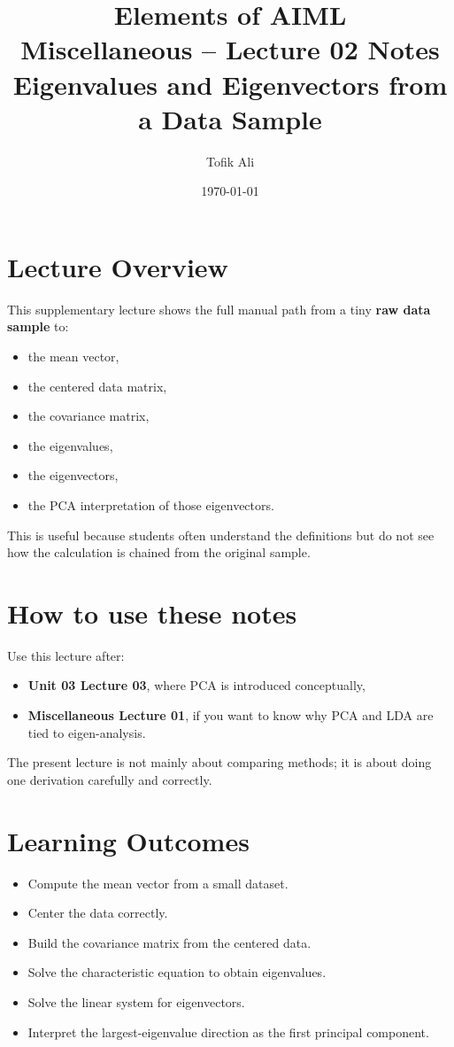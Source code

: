 \documentclass[11pt]{article}
\title{Elements of AIML\\Miscellaneous -- Lecture 02 Notes\\Eigenvalues and Eigenvectors from a Data Sample}
\author{Tofik Ali}
\date{\today}
\begin{document}
\maketitle
\tableofcontents

\section{Lecture Overview}
This supplementary lecture shows the full manual path from a tiny \textbf{raw data sample} to:
\begin{itemize}[leftmargin=*]
  \item the mean vector,
  \item the centered data matrix,
  \item the covariance matrix,
  \item the eigenvalues,
  \item the eigenvectors,
  \item the PCA interpretation of those eigenvectors.
\end{itemize}
This is useful because students often understand the definitions but do not see how the calculation is chained from the original sample.
\notesources{\AIMLMiscSources}

\section{How to use these notes}
Use this lecture after:
\begin{itemize}[leftmargin=*]
  \item \textbf{Unit 03 Lecture 03}, where PCA is introduced conceptually,
  \item \textbf{Miscellaneous Lecture 01}, if you want to know why PCA and LDA are tied to eigen-analysis.
\end{itemize}
The present lecture is not mainly about comparing methods; it is about doing one derivation carefully and correctly.

\section{Learning Outcomes}
\begin{itemize}[leftmargin=*]
  \item Compute the mean vector from a small dataset.
  \item Center the data correctly.
  \item Build the covariance matrix from the centered data.
  \item Solve the characteristic equation to obtain eigenvalues.
  \item Solve the linear system for eigenvectors.
  \item Interpret the largest-eigenvalue direction as the first principal component.
\end{itemize}
\end{document}
